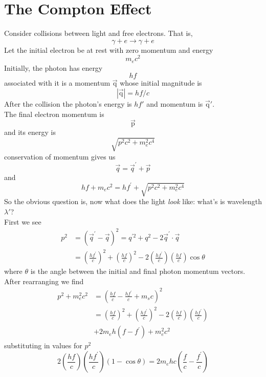 \section{The Compton Effect}
Consider collisions between light and free electrons. That is, 
\[ \gamma + e \rightarrow \gamma + e \]
Let the initial electron be at rest with zero momentum and energy 
\[ m_ec^2 \]
Initially, the photon has energy
\[ hf \]
associated with it is a momentum $ \vec{ \mathrm { q } } $ whose initial magnitude is 
\[ | \vec{ \mathrm { q } }| = hf/c \]
After the collision the photon's energy is $ hf' $ and momentum is $ \vec{ \mathrm { q } }' $.\\
The final electron momentum is \[ \vec{ \mathrm { p } } \] and its energy is 
\[ \sqrt { p ^ { 2 } c ^ { 2 } + m _ { e } ^ { 2 } c ^ { 4 } } \]
conservation of momentum gives us
\[ \vec { q } = \vec { q } ^ { \prime } + \vec { p } \]
and
\[ h f + m _ { e } c ^ { 2 } = h f ^ { \prime } + \sqrt { p ^ { 2 } c ^ { 2 } + m _ { e } ^ { 2 } c ^ { 4 } } \]
So the obvious question is, now what does the light \textit{look} like: what's is wavelength $ \lambda' $?\\
First we see
\[ \begin{aligned} p ^ { 2 } & = \left( \vec { q } ^ { \prime } - \vec { q } \right) ^ { 2 } = q ^ { \prime 2 } + q ^ { 2 } - 2 \vec { q } ^ { \prime } \cdot \vec { q } \\ & = \left( \frac { h f ^ { \prime } } { c } \right) ^ { 2 } + \left( \frac { h f } { c } \right) ^ { 2 } - 2 \left( \frac { h f ^ { \prime } } { c } \right) \left( \frac { h f } { c } \right) \cos \theta \end{aligned} \]
where $ \theta $ is the angle between the initial and final photon momentum vectors. After rearranging we find 
\[ \begin{aligned} p ^ { 2 } + m _ { e } ^ { 2 } c ^ { 2 } & = \left( \frac { h f } { c } - \frac { h f ^ { \prime } } { c } + m _ { s } c \right) ^ { 2 } \\ & = \left( \frac { h f } { c } \right) ^ { 2 } + \left( \frac { h f ^ { \prime } } { c } \right) ^ { 2 } - 2 \left( \frac { h f } { c } \right) \left( \frac { h f ^ { \prime } } { c } \right) \\ & + 2 m _ { e } h \left( f - f ^ { \prime } \right) + m _ { e } ^ { 2 } c ^ { 2 } \end{aligned} \]
substituting in values for $ p^2 $
\[ 2 \left( \frac { h f } { c } \right) \left( \frac { h f ^ { \prime } } { c } \right) ( 1 - \cos \theta ) = 2 m _ { e } h c \left( \frac { f } { c } - \frac { f ^ { \prime } } { c } \right) \]
